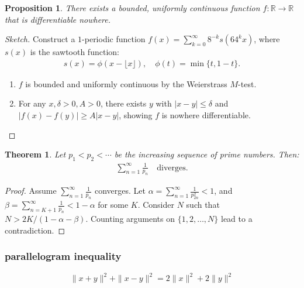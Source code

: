 \documentclass[7pt]{article}
\theoremstyle{definition}
\theoremstyle{plain}
\newtheorem{theorem}{Theorem}
\newtheorem{proposition}{Proposition}
\begin{document}
\begin{proposition}
There exists a bounded, uniformly continuous function $ f : \mathbb{R} \to \mathbb{R} $ that is differentiable nowhere.
\end{proposition}

\begin{proof}[Sketch]
Construct a $ 1 $-periodic function $ f(x) = \sum_{k=0}^\infty 8^{-k}s(64^k x) $, where $ s(x) $ is the sawtooth function:
\begin{align}
s(x) = \phi(x - \lfloor x \rfloor), \quad \phi(t) = \min\{t, 1-t\}.
\end{align}
\begin{enumerate}
    \item $ f $ is bounded and uniformly continuous by the Weierstrass $ M $-test.
    \item For any $ x, \delta > 0, A > 0 $, there exists $ y $ with $ |x - y| \leq \delta $ and $ |f(x) - f(y)| \geq A|x - y| $, showing $ f $ is nowhere differentiable.
\end{enumerate}
\end{proof}

\begin{theorem}
Let $ p_1 < p_2 < \cdots $ be the increasing sequence of prime numbers. Then:
\begin{align}
\sum_{n=1}^\infty \frac{1}{p_n} \quad \text{diverges}.
\end{align}
\end{theorem}

\begin{proof}
Assume $ \sum_{n=1}^\infty \frac{1}{p_n} $ converges. Let $ \alpha = \sum_{n=1}^\infty \frac{1}{p_{2n}^2} < 1 $, and $ \beta = \sum_{n=K+1}^\infty \frac{1}{p_n} < 1 - \alpha $ for some $ K $. Consider $ N $ such that $ N > 2K/(1 - \alpha - \beta) $. Counting arguments on $ \{1, 2, \ldots, N\} $ lead to a contradiction.
\end{proof}
\subsubsection{parallelogram inequality}
\[
\|x + y\|^2 + \|x - y\|^2 = 2\|x\|^2 + 2\|y\|^2
\]
\end{document}
